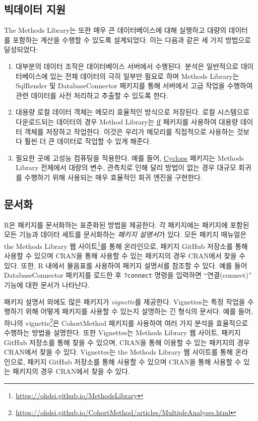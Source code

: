 \documentclass[11pt]{book}
\providecommand{\tightlist}{%
  \setlength{\itemsep}{0pt}\setlength{\parskip}{0pt}}
\let\rmarkdownfootnote\footnote%
\def\footnote{\protect\rmarkdownfootnote}
\theoremstyle{definition}
\theoremstyle{definition}
\theoremstyle{definition}
\theoremstyle{remark}
\begin{document}
\subsection{빅데이터 지원}\label{BigDataSupport}

The Methods Library는 또한 매우 큰 데이터베이스에 대해 실행하고 대량의
데이터를 포함하는 계산을 수행할 수 있도록 설계되었다. 이는 다음과 같은
세 가지 방법으로 달성되었다:

\begin{enumerate}
\def\labelenumi{\arabic{enumi}.}
\tightlist
\item
  대부분의 데이터 조작은 데이터베이스 서버에서 수행된다. 분석은
  일반적으로 데이터베이스에 있는 전체 데이터의 극히 일부만 필요로 하며
  Methods Library는 SqlRender 및 DatabaseConnector 패키지를 통해
  서버에서 고급 작업을 수행하여 관련 데이터를 사전 처리하고 추출할 수
  있도록 한다.
\item
  대용량 로컬 데이터 객체는 메모리 효율적인 방식으로 저장된다. 로컬
  시스템으로 다운로드되는 데이터의 경우 Method Library는
  \href{https://cran.r-project.org/web/packages/ff}{ff} 패키지를
  사용하여 대용량 데이터 객체를 저장하고 작업한다. 이것은 우리가
  메모리를 직접적으로 사용하는 것보다 훨씬 더 큰 데이터로 작업할 수 있게
  해준다.
\item
  필요한 곳에 고성능 컴퓨팅을 적용한다. 예를 들어,
  \href{https://ohdsi.github.io/Cyclops/}{Cyclops} 패키지는 Methods
  Library 전체에서 대량의 변수, 관측치로 인해 달리 방법이 없는 경우
  대규모 회귀를 수행하기 위해 사용되는 매우 효율적인 회귀 엔진을
  구현한다.
\end{enumerate}

\subsection{문서화}

R은 패키지를 문서화하는 표준화된 방법을 제공한다. 각 패키지에는 패키지에
포함된 모든 기능과 데이터 세트를 문서화하는 \emph{패키지 설명서}가 있다.
모든 패키지 매뉴얼은 the Methods Library 웹 사이트\footnote{\url{https://ohdsi.github.io/MethodsLibrary}}를
통해 온라인으로, 패키지 GitHub 저장소를 통해 사용할 수 있으며 CRAN을
통해 사용할 수 있는 패키지의 경우 CRAN에서 찾을 수 있다. 또한, R 내에서
물음표를 사용하여 패키지 설명서를 참조할 수 있다. 예를 들어
DatabaseConnector 패키지를 로드한 후 \texttt{?connect} 명령을 입력하면
``연결(connect)'' 기능에 대한 문서가 나타난다.

패키지 설명서 외에도 많은 패키지가 \emph{vignette}를 제공한다.
Vignettes는 특정 작업을 수행하기 위해 어떻게 패키지를 사용할 수 있는지
설명하는 긴 형식의 문서다. 예를 들어, 하나의 vignette\footnote{\url{https://ohdsi.github.io/CohortMethod/articles/MultipleAnalyses.html}}은
CohortMethod 패키지를 사용하여 여러 가지 분석을 효율적으로 수행하는
방법을 설명한다. 또한 Vignettes는 Methods Library 웹 사이트, 패키지
GitHub 저장소를 통해 찾을 수 있으며, CRAN을 통해 이용할 수 있는 패키지의
경우 CRAN에서 찾을 수 있다. Vignettes는 the Methods Library 웹 사이트를
통해 온라인으로, 패키지 GitHub 저장소를 통해 사용할 수 있으며 CRAN을
통해 사용할 수 있는 패키지의 경우 CRAN에서 찾을 수 있다.
\end{document}
